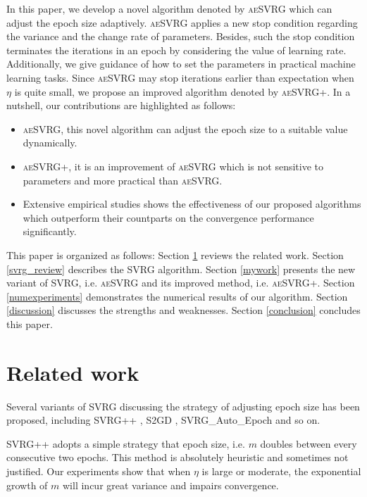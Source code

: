\documentclass[conference]{IEEEtran}
\begin{document}


In this paper, we develop a novel algorithm denoted by \textsc{aeSVRG} which can adjust the epoch size adaptively.  \textsc{aeSVRG} applies a new stop condition regarding the variance and the change rate of parameters. Besides, such the stop condition terminates the iterations in an epoch by considering the value of learning rate.  Additionally, we give guidance of how to set the parameters in practical machine learning tasks. Since \textsc{aeSVRG} may stop iterations earlier than expectation when $\eta$ is quite small, we propose an improved algorithm denoted by \textsc{aeSVRG+}. In a nutshell, our contributions are highlighted as follows:
\begin {itemize}
\item \textsc{aeSVRG}, this novel algorithm can adjust the epoch size to a suitable value dynamically.
\item \textsc{aeSVRG+}, it is an improvement of \textsc{aeSVRG} which is not sensitive to parameters and more practical than \textsc{aeSVRG}.
\item Extensive empirical studies shows the effectiveness of our proposed algorithms which outperform their countparts on the convergence performance significantly.
\end {itemize}
This paper is organized as follows: Section \ref{sectiove_related_work} reviews the related work. Section \ref{svrg_review} describes the SVRG algorithm. Section \ref{mywork} presents the new variant of SVRG, i.e. \textsc{aeSVRG} and its improved method, i.e. \textsc{aeSVRG+}. Section \ref{numexperiments} demonstrates the numerical results of our algorithm. Section \ref{discussion} discusses the strengths and weaknesses.
Section \ref{conclusion} concludes this paper.



\section{Related work}
\label{sectiove_related_work}
Several variants of SVRG  discussing the strategy of adjusting epoch size has been proposed, including SVRG++ \citep{Allen2015Improved}, S2GD \citep{Richtarik:2013te}, SVRG\_Auto\_Epoch \citep{Allen2015Improved} and so on. 

SVRG++ adopts a simple strategy that epoch size, i.e. $m$ doubles between every consecutive two epochs. This method is absolutely heuristic and sometimes not justified. Our experiments show that when $\eta$ is large or moderate, the exponential growth of $m$ will incur great variance and impairs convergence. 
\end{document}
